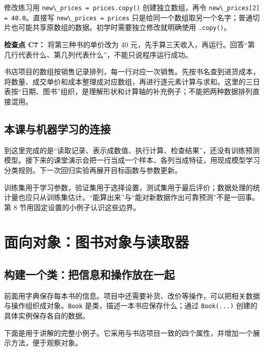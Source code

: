 \documentclass[UTF8,a4paper,11pt,fontset=fandol]{ctexart}
\providecommand{\passthrough}[1]{#1}
\begin{document}
修改练习用 \passthrough{\lstinline!new\_prices = prices.copy()!} 创建独立数组，再令 \passthrough{\lstinline!new\_prices[2] = 40.0!}。直接写 \passthrough{\lstinline!new\_prices = prices!} 只是给同一个数组取另一个名字；普通切片也可能共享原数组的数据。初学时需要独立修改就明确使用 \passthrough{\lstinline!.copy()!}。

\textbf{检查点 C7：} 将第三种书的单价改为 40 元，先手算三天收入，再运行。回答``第几行代表什么、第几列代表什么''，不能只说程序运行成功。

书店项目的数组按销售记录排列，每一行对应一次销售。先按书名查到进货成本，将数量、成交单价和成本整理成对应数组，再进行逐元素计算与求和。这里的三日表按``日期、图书''组织，是理解形状和计算轴的补充例子；不能把两种数据排列直接混用。

\subsection{本课与机器学习的连接}\label{ux672cux8bfeux4e0eux673aux5668ux5b66ux4e60ux7684ux8fdeux63a5}

到这里完成的是``读取记录、表示成数值、执行计算、检查结果''，还没有训练预测模型。接下来的课堂演示会把一行当成一个样本、各列当成特征，用现成模型学习分类规则。下一次回归实验再展开目标函数与参数更新。

训练集用于学习参数，验证集用于选择设置，测试集用于最后评价；数据处理的统计量也应只从训练集估计。``能算出来''与``能对新数据作出可靠预测''不是一回事。第 8 节用固定设置的小例子认识这些边界。

\clearpage

\section{面向对象：图书对象与读取器}\label{ux9762ux5411ux5bf9ux8c61ux56feux4e66ux5bf9ux8c61ux4e0eux8bfbux53d6ux5668}

\subsection{构建一个类：把信息和操作放在一起}\label{ux6784ux5efaux4e00ux4e2aux7c7bux628aux4fe1ux606fux548cux64cdux4f5cux653eux5728ux4e00ux8d77}

前面用字典保存每本书的信息。项目中还需要补货、改价等操作，可以把相关数据与操作组织成对象。\passthrough{\lstinline!Book!} 是类，描述一本书应保存什么；通过 \passthrough{\lstinline!Book(...)!} 创建的具体实例保存各自的数据。

下面是用于讲解的完整小例子。它采用与书店项目一致的四个属性，并增加一个展示方法，便于观察对象。
\end{document}
